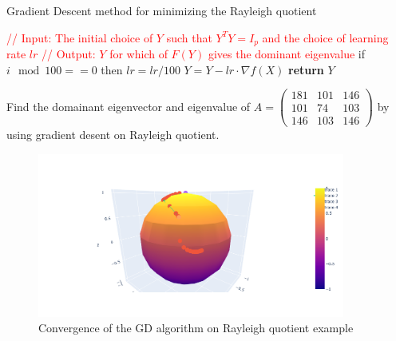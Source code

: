 \documentclass[11pt,a4paper]{report}
\begin{document}
\begin{algorithm}
\caption{Gradient Descent method for minimizing the Rayleigh quotient}
    \begin{algorithmic}[1]
        \State \textcolor{red}{// Input: The initial choice of $Y$ such that $Y^T Y = I_p$ and the choice of learning rate $lr$}
        \State \textcolor{red}{// Output: $Y$ for which of $F(Y)$ gives the dominant eigenvalue}
        \State if $i \mod 100 == 0$ then $lr = lr/100$ 
        \State $Y = Y - lr \cdot  \nabla f (X)$
        \EndFor
        \State \textbf{return} $Y$
        \EndProcedure
    \end{algorithmic}
\end{algorithm}
\begin{Ex}
    Find the domainant eigenvector and eigenvalue of $A = \begin{pmatrix} 181 & 101 & 146 \\ 101 & 74 & 103 \\ 146 & 103 & 146 \end{pmatrix} $ 
    by using gradient desent on Rayleigh quotient.
\end{Ex}
\begin{figure}[h] \label{gradRay}
    \centering
    \includegraphics[width=0.90\textwidth]{gradientDescent1.png}
    \caption{Convergence of the GD algorithm on Rayleigh quotient example}
\end{figure}
\end{document}
